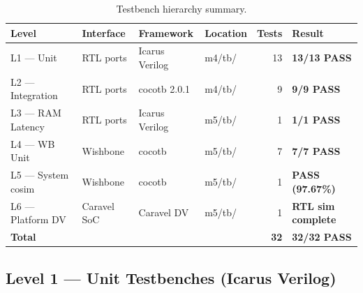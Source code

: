 \documentclass[11pt]{article}
\begin{document}
\begin{table}[H]
  \centering
  \caption{Testbench hierarchy summary.}
  \label{tab:tb}
  \small
  \begin{tabular}{llllrl}
    \toprule
    Level & Interface & Framework & Location & Tests & Result \\
    \midrule
    L1 --- Unit          & RTL ports & Icarus Verilog & m4/tb/ & 13 & \textbf{13/13 PASS} \\
    L2 --- Integration   & RTL ports & cocotb 2.0.1   & m4/tb/ & 9  & \textbf{9/9 PASS} \\
    L3 --- RAM Latency   & RTL ports & Icarus Verilog & m5/tb/ & 1  & \textbf{1/1 PASS} \\
    L4 --- WB Unit       & Wishbone  & cocotb         & m5/tb/ & 7  & \textbf{7/7 PASS} \\
    L5 --- System cosim  & Wishbone  & cocotb         & m5/tb/ & 1  & \textbf{PASS (97.67\%)} \\
    L6 --- Platform DV   & Caravel SoC & Caravel DV  & m5/tb/ & 1  & \textbf{RTL sim complete} \\
    \midrule
    \textbf{Total} & & & & \textbf{32} & \textbf{32/32 PASS} \\
    \bottomrule
  \end{tabular}
\end{table}

\subsection{Level 1 --- Unit Testbenches (Icarus Verilog)}
\end{document}
